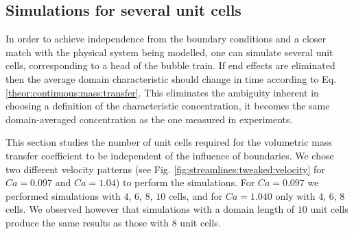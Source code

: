 \documentclass[preprint,12pt]{elsarticle}
\begin{document}

\subsection{Simulations for several unit cells}
In order to achieve independence from the boundary conditions and a closer match with
the physical system being modelled, one can simulate several unit cells, corresponding
to a head of the bubble train.  If end effects are eliminated then the average
domain characteristic should change in time according to Eq.
\ref{theor:continuous:mass:transfer}. This eliminates the ambiguity inherent in choosing a definition
of the characteristic concentration, it becomes the same domain-averaged concentration
as the one measured in experiments.

This section studies the number of unit cells required for the volumetric
mass transfer coefficient to be independent of the influence of boundaries. We chose two
different
velocity patterns (see Fig. \ref{fig:streamlines:tweaked:velocity} for $Ca=0.097$ and $Ca=1.04$) to
perform the simulations. For $Ca=0.097$ we performed simulations with
$4$, $6$, $8$, $10$ cells, and for $Ca=1.040$ only with $4$, $6$, $8$ cells.
We observed however that simulations with a domain length of $10$ unit cells produce the same results as those with $8$ unit cells.
\end{document}
